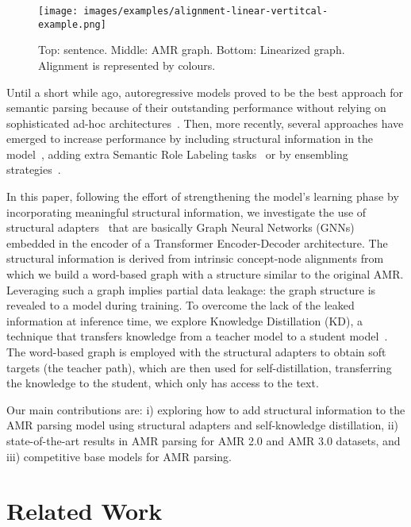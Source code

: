 \documentclass[11pt]{article}
\begin{document}
\begin{figure}[!t]
  \centering
  \texttt{[image: images/examples/alignment-linear-vertitcal-example.png]}

  \caption{Top: sentence. Middle: AMR graph. Bottom: Linearized graph. Alignment is represented by colours.}
  \label{fig:amr-align-example}
\end{figure}


Until a short while ago, autoregressive models proved to be the best approach for semantic parsing because of their outstanding performance without relying on sophisticated ad-hoc architectures~\cite{bevilacqua-etal-2021-one}. Then, more recently, several approaches have emerged to increase performance by including structural information in the model~\cite{naacl-amrize-2021}, adding extra Semantic Role Labeling tasks~\cite{bai-etal-2022-graph} or by ensembling strategies~\cite{neurips-graphene-2021, lee-etal-2022-maximum}.

In this paper, following the effort of strengthening the model's learning phase by incorporating meaningful structural information, we investigate the use of structural adapters~\citep{ribeiro-etal-2021-structural} that are basically Graph Neural Networks (GNNs) embedded in the encoder of a Transformer Encoder-Decoder architecture. The 
 structural information is derived from intrinsic concept-node alignments from which we build a word-based graph with a structure similar to the original AMR. Leveraging such a graph implies partial data leakage: the graph structure is revealed to a model during training. 
 To overcome the lack of the leaked information at inference time, we explore Knowledge Distillation (KD), a technique that transfers knowledge from a teacher model to a student model~\cite{Hinton2015DistillingTK}. The word-based graph is employed with the structural adapters to obtain soft targets (the teacher path), which are then used for self-distillation, transferring the knowledge to the student, which only has access to the text.

Our main contributions are: i) exploring how to add structural information to the AMR parsing model using structural adapters and self-knowledge distillation, ii) state-of-the-art results in AMR parsing for AMR 2.0 and AMR 3.0 datasets, and iii) competitive base models for AMR parsing.




\section{Related Work}
\end{document}
